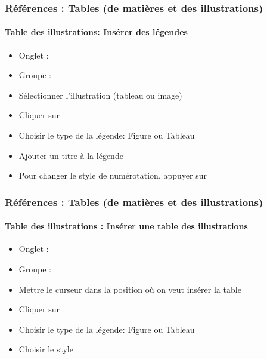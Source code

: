 \documentclass[xcolor=table]{beamer}
\begin{document}

\begin{frame}[t]
\frametitle{Références : Tables (de matières et des illustrations)}
\framesubtitle{Table des illustrations: Insérer des légendes}

\begin{minipage}{0.61\textwidth}
	\begin{itemize}
		\item Onglet : 
		\item Groupe : 
		\item Sélectionner l'illustration (tableau ou image)
		\item Cliquer sur 
		\item Choisir le type de la légende: Figure ou Tableau
		\item Ajouter un titre à la légende
		\item Pour changer le style de numérotation, appuyer sur 
	\end{itemize}
\end{minipage}
\begin{minipage}{0.38\textwidth}
	
	
\end{minipage}

\end{frame}

\begin{frame}[t]
\frametitle{Références : Tables (de matières et des illustrations)}
\framesubtitle{Table des illustrations : Insérer une table des illustrations}

\begin{minipage}{0.61\textwidth}
	\begin{itemize}
		\item Onglet : 
		\item Groupe : 
		\item Mettre le curseur dans la position où on veut insérer la table
		\item Cliquer sur 
		\item Choisir le type de la légende: Figure ou Tableau
		\item Choisir le style
	\end{itemize}
\end{minipage}
\begin{minipage}{0.38\textwidth}
	
	
\end{minipage}

\end{frame}
\end{document}

